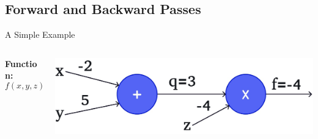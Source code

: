 \documentclass[serif, aspectratio=169]{beamer}
\begin{document}
\subsection{Forward and Backward Passes}


\begin{frame}{A Simple Example}

    \begin{columns}
       
        \begin{column}{0.3\textwidth}
            \vspace{-0.4cm} %
            \textbf{Function:} 
            \[
            f(x, y, z) = (x + y)z
            \]
        \end{column}

        \begin{column}{0.7\textwidth}
                    \begin{center}
                \includegraphics[width=\textwidth, keepaspectratio]{pic/b1.jpg}
            \end{center}
        \end{column}

    \end{columns}
\end{frame}
\end{document}
